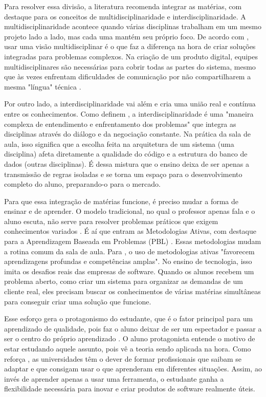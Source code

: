 Para resolver essa divisão, a literatura recomenda integrar as matérias, com
destaque para os conceitos de multidisciplinaridade e interdisciplinaridade. A
multidisciplinaridade acontece quando várias disciplinas trabalham em um mesmo
projeto lado a lado, mas cada uma mantém seu próprio foco. De acordo com
\cite{bentes2024integracao}, usar uma visão multidisciplinar é o que faz a
diferença na hora de criar soluções integradas para problemas complexos. Na
criação de um produto digital, equipes multidisciplinares são necessárias para
cobrir todas as partes do sistema, mesmo que às vezes enfrentam dificuldades de
comunicação por não compartilharem a mesma "língua" técnica
\cite{silva2024processo}.

Por outro lado, a interdisciplinaridade vai além e cria uma união real e
contínua entre os conhecimentos. Como definem
, a interdisciplinaridade é
uma "maneira complexa de entendimento e enfrentamento dos problemas" que
integra as disciplinas através do diálogo e da negociação constante. Na prática
da sala de aula, isso significa que a escolha feita na arquitetura de um
sistema (uma disciplina) afeta diretamente a qualidade do código e a estrutura
do banco de dados (outras disciplinas). É dessa mistura que o ensino deixa de
ser apenas a transmissão de regras isoladas e se torna um espaço para o
desenvolvimento completo do aluno, preparando-o para o mercado.

Para que essa integração de matérias funcione, é preciso mudar a forma de
ensinar e de aprender. O modelo tradicional, no qual o professor apenas fala e
o aluno escuta, não serve para resolver problemas práticos que exigem
conhecimentos variados \cite{ribeiro2025interdisciplinaridade}. É aí que entram
as Metodologias Ativas, com destaque para a Aprendizagem Baseada em Problemas
(PBL) \cite{ribeiro2025interdisciplinaridade}. Essas metodologias mudam a
rotina comum da sala de aula. Para
, o uso de metodologias ativas
"favorecem aprendizagens profundas e competências amplas". No ensino de
tecnologia, isso imita os desafios reais das empresas de software. Quando os
alunos recebem um problema aberto, como criar um sistema para organizar as
demandas de um cliente real, eles precisam buscar os conhecimentos de várias
matérias simultâneas para conseguir criar uma solução que funcione.

Esse esforço gera o protagonismo do estudante, que é o fator principal para um
aprendizado de qualidade, pois faz o aluno deixar de ser um espectador e passar
a ser o centro do próprio aprendizado \cite{ribeiro2025interdisciplinaridade}.
O aluno protagonista entende o motivo de estar estudando aquele assunto, pois
vê a teoria sendo aplicada na hora. Como reforça
, as universidades têm o dever de formar
profissionais que saibam se adaptar e que consigam usar o que aprenderam em
diferentes situações. Assim, ao invés de aprender apenas a usar uma ferramenta,
o estudante ganha a flexibilidade necessária para inovar e criar produtos de
software realmente úteis.

